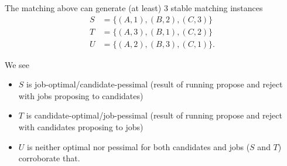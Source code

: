 The matching above can generate (at least) 3 stable matching instances \begin{align*}
    S &= \{(A,1), (B,2), (C,3)\} \\
    T &= \{(A,3), (B,1), (C,2)\} \\
    U &= \{(A,2), (B,3), (C,1)\}. 
\end{align*}

We see \begin{itemize}
    \item $S$ is job-optimal/candidate-pessimal (result of running propose and reject with jobs proposing to candidates)
    \item $T$ is candidate-optimal/job-pessimal (result of running propose and reject with candidates proposing to jobs)
    \item $U$ is neither optimal nor pessimal for both candidates and jobs ($S$ and $T$) corroborate that. 
\end{itemize}